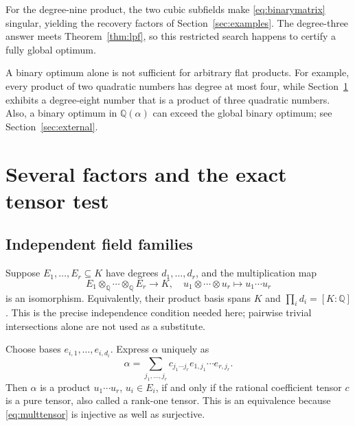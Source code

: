 \documentclass[11pt,letterpaper]{article}
\theoremstyle{definition}
\theoremstyle{remark}
\newcommand{\Q}{\mathbb Q}
\begin{document}
For the degree-nine product, the two cubic subfields make
\eqref{eq:binarymatrix} singular, yielding the recovery factors of
Section~\ref{sec:examples}. The degree-three answer meets
Theorem~\ref{thm:lpf}, so this restricted search happens to certify a
fully global optimum.

A binary optimum alone is not sufficient for arbitrary flat products.
For example, every product of two quadratic numbers has degree at most
four, while Section~\ref{sec:tensor} exhibits a degree-eight number that is
a product of three quadratic numbers. Also, a binary optimum in
\(\Q(\alpha)\) can exceed the global binary optimum; see
Section~\ref{sec:external}.

\section{Several factors and the exact tensor test}\label{sec:tensor}
\subsection{Independent field families}
Suppose \(E_1,\ldots,E_r\subseteq K\) have degrees
\(d_1,\ldots,d_r\), and the multiplication map
\begin{equation}
 E_1\otimes_\Q\cdots\otimes_\Q E_r\longrightarrow K,
 \quad u_1\otimes\cdots\otimes u_r\longmapsto u_1\cdots u_r
 \label{eq:multtensor}
\end{equation}
is an isomorphism. Equivalently, their product basis spans \(K\) and
\(\prod_i d_i=[K:\Q]\). This is the precise independence condition
needed here; pairwise trivial intersections alone are not used as a
substitute.

Choose bases \(e_{i,1},\ldots,e_{i,d_i}\). Express \(\alpha\) uniquely as
\[
 \alpha=\sum_{j_1,\ldots,j_r}c_{j_1\cdots j_r}
       e_{1,j_1}\cdots e_{r,j_r}.
\]
Then \(\alpha\) is a product \(u_1\cdots u_r\), \(u_i\in E_i\), if
and only if the rational coefficient tensor \(c\) is a pure tensor, also
called a rank-one tensor. This is an equivalence because
\eqref{eq:multtensor} is injective as well as surjective.
\end{document}
